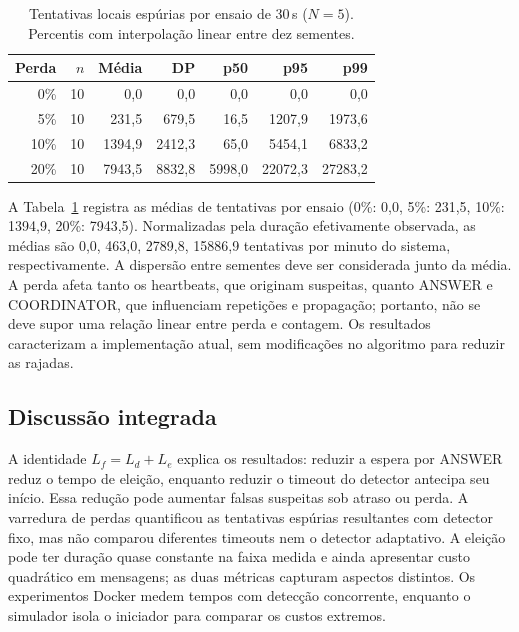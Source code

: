 \documentclass[conference]{IEEEtran}
\begin{document}
\begin{table}[t]
\centering
\caption{Tentativas locais espúrias por ensaio de 30\,s ($N=5$). Percentis com interpolação linear entre dez sementes.}
\label{tab:bully-loss}
\footnotesize
\begin{tabular}{rrrrrrr}
\toprule
\textbf{Perda} & $n$ & \textbf{Média} & \textbf{DP} & \textbf{p50} & \textbf{p95} & \textbf{p99} \\
\midrule
0\% & 10 & 0,0 & 0,0 & 0,0 & 0,0 & 0,0 \\
5\% & 10 & 231,5 & 679,5 & 16,5 & 1207,9 & 1973,6 \\
10\% & 10 & 1394,9 & 2412,3 & 65,0 & 5454,1 & 6833,2 \\
20\% & 10 & 7943,5 & 8832,8 & 5998,0 & 22072,3 & 27283,2 \\
\bottomrule
\end{tabular}
\end{table}

A Tabela~\ref{tab:bully-loss} registra as médias de tentativas por ensaio (0\%: 0,0, 5\%: 231,5, 10\%: 1394,9, 20\%: 7943,5). Normalizadas pela duração efetivamente observada, as médias são 0,0, 463,0, 2789,8, 15886,9 tentativas por minuto do sistema, respectivamente. A dispersão entre sementes deve ser considerada junto da média. A perda afeta tanto os heartbeats, que originam suspeitas, quanto ANSWER e COORDINATOR, que influenciam repetições e propagação; portanto, não se deve supor uma relação linear entre perda e contagem. Os resultados caracterizam a implementação atual, sem modificações no algoritmo para reduzir as rajadas.

\subsection{Discussão integrada}
\label{sec:discussao}

A identidade $L_f=L_d+L_e$ explica os resultados: reduzir a espera por ANSWER reduz o tempo de eleição, enquanto reduzir o timeout do detector antecipa seu início. Essa redução pode aumentar falsas suspeitas sob atraso ou perda. A varredura de perdas quantificou as tentativas espúrias resultantes com detector fixo, mas não comparou diferentes timeouts nem o detector adaptativo. A eleição pode ter duração quase constante na faixa medida e ainda apresentar custo quadrático em mensagens; as duas métricas capturam aspectos distintos. Os experimentos Docker medem tempos com detecção concorrente, enquanto o simulador isola o iniciador para comparar os custos extremos.
\end{document}
